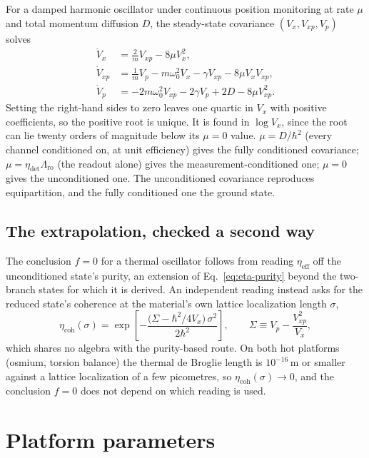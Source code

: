 \documentclass[aps,pra,reprint,amsmath,amssymb,superscriptaddress]{revtex4-2}
\begin{document}
For a damped harmonic oscillator under continuous position monitoring at
rate $\mu$ and total momentum diffusion $D$, the steady-state covariance
$(V_x,V_{xp},V_p)$ solves
\begin{align}
  \dot V_x  &= \tfrac{2}{m}V_{xp} - 8\mu V_x^2, \\
  \dot V_{xp} &= \tfrac{1}{m}V_p - m\omega_0^2V_x - \gamma V_{xp} - 8\mu
                 V_xV_{xp}, \\
  \dot V_p  &= -2m\omega_0^2V_{xp} - 2\gamma V_p + 2D - 8\mu V_{xp}^2.
\end{align}
Setting the right-hand sides to zero leaves one quartic in $V_x$ with
positive coefficients, so the positive root is unique. It is found in
$\log V_x$, since the root can lie twenty orders of magnitude below its
$\mu=0$ value. $\mu=D/\hbar^2$ (every channel
conditioned on, at unit efficiency) gives the fully conditioned covariance;
$\mu=\eta_{\det}\Lambda_{\mathrm{ro}}$ (the readout alone) gives the
measurement-conditioned one; $\mu=0$ gives the unconditioned one. The
unconditioned covariance reproduces equipartition, and the fully conditioned
one the ground state.

\subsection{The extrapolation, checked a second way}
\label{app:adapter-check}

The conclusion $f=0$ for a thermal oscillator follows from reading
$\eta_{\mathrm{eff}}$ off the unconditioned state's purity, an extension of
Eq.~\eqref{eq:eta-purity} beyond the two-branch states for which it is
derived.
An independent reading instead asks for the reduced state's coherence at the
material's own lattice localization length $\sigma$,
\begin{equation}
  \eta_{\mathrm{coh}}(\sigma) = \exp\!\left[-\frac{\big(\Sigma-\hbar^2/4V_x
  \big)\,\sigma^2}{2\hbar^2}\right],\qquad \Sigma\equiv V_p-\frac{V_{xp}^2}
  {V_x},
\end{equation}
which shares no algebra with the purity-based route. On both hot platforms
(osmium, torsion balance) the thermal de Broglie length is $10^{-16}\,
\mathrm{m}$ or smaller against a lattice localization of a few picometres, so
$\eta_{\mathrm{coh}}(\sigma)\to0$, and the conclusion $f=0$ does not depend
on which reading is used. %

\section{Platform parameters}
\label{app:platforms}
\end{document}
